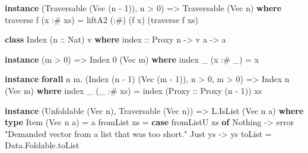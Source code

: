 \documentclass[]{article}
\newenvironment{Shaded}{}{}
\newcommand{\DataTypeTok}[1]{\textcolor[rgb]{0.56,0.13,0.00}{#1}}
\newcommand{\DecValTok}[1]{\textcolor[rgb]{0.25,0.63,0.44}{#1}}
\newcommand{\FunctionTok}[1]{\textcolor[rgb]{0.02,0.16,0.49}{#1}}
\newcommand{\KeywordTok}[1]{\textcolor[rgb]{0.00,0.44,0.13}{\textbf{#1}}}
\newcommand{\NormalTok}[1]{#1}
\newcommand{\OperatorTok}[1]{\textcolor[rgb]{0.40,0.40,0.40}{#1}}
\newcommand{\OtherTok}[1]{\textcolor[rgb]{0.00,0.44,0.13}{#1}}
\newcommand{\StringTok}[1]{\textcolor[rgb]{0.25,0.44,0.63}{#1}}
\begin{document}
\begin{Shaded}
\begin{Highlighting}[]
\KeywordTok{instance}\NormalTok{ (}\DataTypeTok{Traversable}\NormalTok{ (}\DataTypeTok{Vec}\NormalTok{ (n }\OperatorTok{{-}} \DecValTok{1}\NormalTok{)), n }\OperatorTok{\textgreater{}} \DecValTok{0}\NormalTok{) }\OtherTok{=\textgreater{}} \DataTypeTok{Traversable}\NormalTok{ (}\DataTypeTok{Vec}\NormalTok{ n) }\KeywordTok{where}
    \FunctionTok{traverse}\NormalTok{ f (x }\OperatorTok{:\#}\NormalTok{ xs) }\OtherTok{=}\NormalTok{ liftA2 (}\OperatorTok{:\#}\NormalTok{) (f x) (}\FunctionTok{traverse}\NormalTok{ f xs)}

\KeywordTok{class} \DataTypeTok{Index}\NormalTok{ (}\OtherTok{n ::} \DataTypeTok{Nat}\NormalTok{) v }\KeywordTok{where}
\OtherTok{    index ::} \DataTypeTok{Proxy}\NormalTok{ n }\OtherTok{{-}\textgreater{}}\NormalTok{ v a }\OtherTok{{-}\textgreater{}}\NormalTok{ a}

\KeywordTok{instance}\NormalTok{ (m }\OperatorTok{\textgreater{}} \DecValTok{0}\NormalTok{) }\OtherTok{=\textgreater{}} \DataTypeTok{Index} \DecValTok{0}\NormalTok{ (}\DataTypeTok{Vec}\NormalTok{ m) }\KeywordTok{where}
    \FunctionTok{index}\NormalTok{ \_ (x }\OperatorTok{:\#}\NormalTok{ \_) }\OtherTok{=}\NormalTok{ x}

\KeywordTok{instance} \KeywordTok{forall}\NormalTok{ n m}\OperatorTok{.}\NormalTok{ (}\DataTypeTok{Index}\NormalTok{ (n }\OperatorTok{{-}} \DecValTok{1}\NormalTok{) (}\DataTypeTok{Vec}\NormalTok{ (m }\OperatorTok{{-}} \DecValTok{1}\NormalTok{)), n }\OperatorTok{\textgreater{}} \DecValTok{0}\NormalTok{, m }\OperatorTok{\textgreater{}} \DecValTok{0}\NormalTok{) }\OtherTok{=\textgreater{}} \DataTypeTok{Index}\NormalTok{ n (}\DataTypeTok{Vec}\NormalTok{ m) }\KeywordTok{where}
    \FunctionTok{index}\NormalTok{ \_ (\_ }\OperatorTok{:\#}\NormalTok{ xs) }\OtherTok{=} \FunctionTok{index}\NormalTok{ (}\DataTypeTok{Proxy}\OtherTok{ ::} \DataTypeTok{Proxy}\NormalTok{ (n }\OperatorTok{{-}} \DecValTok{1}\NormalTok{)) xs}

\KeywordTok{instance}\NormalTok{ (}\DataTypeTok{Unfoldable}\NormalTok{ (}\DataTypeTok{Vec}\NormalTok{ n), }\DataTypeTok{Traversable}\NormalTok{ (}\DataTypeTok{Vec}\NormalTok{ n)) }\OtherTok{=\textgreater{}} \DataTypeTok{L.IsList}\NormalTok{ (}\DataTypeTok{Vec}\NormalTok{ n a) }\KeywordTok{where}
    \KeywordTok{type} \DataTypeTok{Item}\NormalTok{ (}\DataTypeTok{Vec}\NormalTok{ n a) }\OtherTok{=}\NormalTok{ a}
\NormalTok{    fromList xs }\OtherTok{=} \KeywordTok{case}\NormalTok{ fromListU xs }\KeywordTok{of}
                    \DataTypeTok{Nothing} \OtherTok{{-}\textgreater{}} \FunctionTok{error} \StringTok{"Demanded vector from a list that was too short."}
                    \DataTypeTok{Just}\NormalTok{ ys }\OtherTok{{-}\textgreater{}}\NormalTok{ ys}
\NormalTok{    toList      }\OtherTok{=}\NormalTok{ Data.Foldable.toList}
\end{Highlighting}
\end{Shaded}
\end{document}
